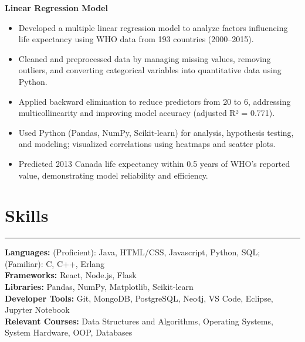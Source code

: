 \documentclass[10pt]{article}
\begin{document}
\textbf{Linear Regression Model} 
\vspace{-4mm}
\begin{itemize}[left=0.15in, itemsep=0pt]
    \item Developed a multiple linear regression model to analyze factors influencing life expectancy using WHO data from 193 countries (2000–2015).
    \item Cleaned and preprocessed data by managing missing values, removing outliers, and converting categorical variables into quantitative data using Python.
    \item Applied backward elimination to reduce predictors from 20 to 6, addressing multicollinearity and improving model accuracy (adjusted R² = 0.771).
    \item Used Python (Pandas, NumPy, Scikit-learn) for analysis, hypothesis testing, and modeling; visualized correlations using heatmaps and scatter plots.
    \item Predicted 2013 Canada life expectancy within 0.5 years of WHO’s reported value, demonstrating model reliability and efficiency.
\end{itemize}

\section*{Skills}
\vspace{-2mm}
\hrule
\vspace{0mm}
\textbf{Languages:} (Proficient): Java, HTML/CSS, Javascript, Python, SQL; (Familiar): C, C++, Erlang \\
\textbf{Frameworks:} React, Node.js, Flask  \\
\textbf{Libraries:} Pandas, NumPy, Matplotlib, Scikit-learn \\
\textbf{Developer Tools:} Git, MongoDB, PostgreSQL, Neo4j, VS Code, Eclipse, Jupyter Notebook \\
\textbf{Relevant Courses:} Data Structures and Algorithms, Operating Systems, System Hardware, OOP, Databases
\end{document}
